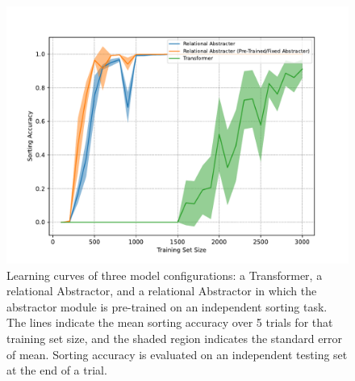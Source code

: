 \begin{figure}[h!]
	\centering
	\includegraphics[width=\textwidth]{figures/random_object_argsort_learning_curves.pdf}
	\caption{Learning curves of three model configurations: a Transformer, a relational Abstractor, and a relational Abstractor in which the abstractor module is pre-trained on an independent sorting task. The lines indicate the mean sorting accuracy over 5 trials for that training set size, and the shaded region indicates the standard error of mean. Sorting accuracy is evaluated on an independent testing set at the end of a trial.}
	\label{fig:random_object_argsort_learning_curves}
\end{figure}